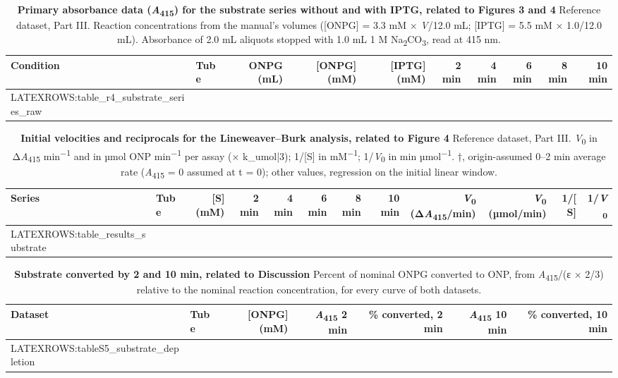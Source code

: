 \documentclass[9pt,twocolumn]{extarticle}
\newcommand{\Vo}{\textit{V}\textsubscript{0}}
\newcommand{\Aa}{\textit{A}\textsubscript{415}}
\newcommand{\dAa}{Δ\textit{A}\textsubscript{415}}
\newcommand{\permin}{min\textsuperscript{−1}}
\newcommand{\dash}{–}
\begin{document}
\begin{table}[h]
\caption{\textbf{Primary absorbance data (\Aa) for the substrate series without and with IPTG, related to Figures 3 and 4}\newline
Reference dataset, Part III. Reaction concentrations from the manual's volumes ([ONPG] = 3.3 mM × \textit{V}/12.0 mL; [IPTG] = 5.5 mM × 1.0/12.0 mL). Absorbance of 2.0 mL aliquots stopped with 1.0 mL 1 M Na\textsubscript{2}CO\textsubscript{3}, read at 415 nm.}
\footnotesize
\begin{tabular}{@{}llrrrrrrrr@{}}
\toprule
Condition & Tube & ONPG (mL) & [ONPG] (mM) & [IPTG] (mM) & 2 min & 4 min & 6 min & 8 min & 10 min \\
\midrule
{{LATEXROWS:table_r4_substrate_series_raw}}
\bottomrule
\end{tabular}
\end{table}

\begin{table}[h]
\caption{\textbf{Initial velocities and reciprocals for the Lineweaver\dash Burk analysis, related to Figure 4}\newline
Reference dataset, Part III. \Vo{} in \dAa{} \permin{} and in µmol ONP \permin{} per assay (× {{k_umol|3}}); 1/[S] in mM\textsuperscript{−1}; 1/\Vo{} in min µmol\textsuperscript{−1}. †, origin-assumed 0\dash 2 min average rate (\Aa{} = 0 assumed at t = 0); other values, regression on the initial linear window.}
\footnotesize
\begin{tabular}{@{}llrrrrrrrrrr@{}}
\toprule
Series & Tube & [S] (mM) & 2 min & 4 min & 6 min & 8 min & 10 min & \Vo{} (\dAa/min) & \Vo{} (µmol/min) & 1/[S] & 1/\Vo \\
\midrule
{{LATEXROWS:table_results_substrate}}
\bottomrule
\end{tabular}
\end{table}

\begin{table}[h]
\caption{\textbf{Substrate converted by 2 and 10 min, related to Discussion}\newline
Percent of nominal ONPG converted to ONP, from \Aa/(ε × 2/3) relative to the nominal reaction concentration, for every curve of both datasets.}
\footnotesize
\begin{tabular}{@{}llrrrrr@{}}
\toprule
Dataset & Tube & [ONPG] (mM) & \Aa{} 2 min & \% converted, 2 min & \Aa{} 10 min & \% converted, 10 min \\
\midrule
{{LATEXROWS:tableS5_substrate_depletion}}
\bottomrule
\end{tabular}
\end{table}
\end{document}
